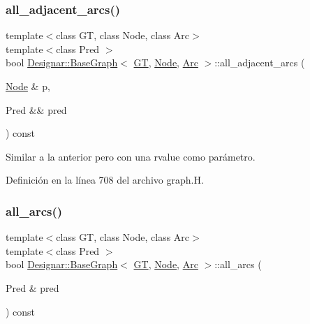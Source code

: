 \subsubsection{\texorpdfstring{all\+\_\+adjacent\+\_\+arcs()}{all\_adjacent\_arcs()}\hspace{0.1cm}{\footnotesize\ttfamily [2/2]}}
{\footnotesize\ttfamily template$<$class GT, class Node, class Arc$>$ \\
template$<$class Pred $>$ \\
bool \hyperlink{class_designar_1_1_base_graph}{Designar\+::\+Base\+Graph}$<$ \hyperlink{demo-buildgraph_8_c_a3001c40d2c31ca87ed96cd7d1334a55e}{GT}, \hyperlink{namespace_designar_a5af326c65aa2bd26b26c410f2030d09e}{Node}, \hyperlink{namespace_designar_a3f55fb5513d62ff47cbc8f72b8e95d6f}{Arc} $>$\+::all\+\_\+adjacent\+\_\+arcs (\begin{DoxyParamCaption}\item[{\hyperlink{namespace_designar_a5af326c65aa2bd26b26c410f2030d09e}{Node} \&}]{p,  }\item[{Pred \&\&}]{pred }\end{DoxyParamCaption}) const\hspace{0.3cm}{\ttfamily [inline]}}



Similar a la anterior pero con una rvalue como parámetro. 



Definición en la línea 708 del archivo graph.\+H.

\mbox{\label{class_designar_1_1_base_graph_a3e2a55dafde6b1edf42f88f4c7d066b8}} 
\subsubsection{\texorpdfstring{all\+\_\+arcs()}{all\_arcs()}\hspace{0.1cm}{\footnotesize\ttfamily [1/2]}}
{\footnotesize\ttfamily template$<$class GT, class Node, class Arc$>$ \\
template$<$class Pred $>$ \\
bool \hyperlink{class_designar_1_1_base_graph}{Designar\+::\+Base\+Graph}$<$ \hyperlink{demo-buildgraph_8_c_a3001c40d2c31ca87ed96cd7d1334a55e}{GT}, \hyperlink{namespace_designar_a5af326c65aa2bd26b26c410f2030d09e}{Node}, \hyperlink{namespace_designar_a3f55fb5513d62ff47cbc8f72b8e95d6f}{Arc} $>$\+::all\+\_\+arcs (\begin{DoxyParamCaption}\item[{Pred \&}]{pred }\end{DoxyParamCaption}) const\hspace{0.3cm}{\ttfamily [inline]}}



